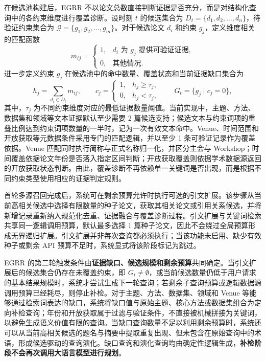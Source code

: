 \documentclass[a4paper,12pt,fontset=none]{ctexart}
\begin{document}
在候选池构建后，EGRR 不以论文总数直接判断证据是否充分，而是对结构化查询中的各约束维度进行覆盖诊断。设时刻 $t$ 的候选集合为 $D_t=\{d_1,d_2,\ldots,d_n\}$，待验证约束集合为 $\mathcal{G}=\{g_1,g_2,\ldots,g_m\}$。对于候选论文 $d_i$ 和约束 $g_j$，定义维度相关的匹配函数
\begin{equation}
	m_{ij}=
	\begin{cases}
		1, & d_i \text{ 为 } g_j \text{ 提供可验证证据},\\
		0, & \text{其他情况}.
	\end{cases}
\end{equation}
进一步定义约束 $g_j$ 在候选池中的命中数量、覆盖状态和当前证据缺口集合为
\begin{equation}
	h_j=\sum_{d_i\in D_t}m_{ij},
	\qquad
	c_j=
	\begin{cases}
		1, & h_j\geq\tau_j,\\
		0, & h_j<\tau_j,
	\end{cases}
	\qquad
	G_t=\{g_j\mid c_j=0\},
\end{equation}
其中，$\tau_j$ 为不同约束维度对应的最低证据数量阈值。当前实现中，主题、方法、数据集和领域等文本证据默认至少需要 2 篇候选支持；候选文本与约束词项的重叠比例达到约束词项数量的一半时，记为一次有效文本命中。Venue、时间范围和开放获取等元数据条件采用专门的匹配逻辑，并以至少 1 条可验证记录作为覆盖依据。Venue 匹配同时执行简称与正式名称归一化，并区分主会与 Workshop；时间覆盖依据论文年份是否落入指定区间判断；开放获取覆盖则依据学术数据源返回的开放获取状态判断。由此，覆盖诊断不再依赖单一关键词是否出现，而是根据不同约束类型使用相应的证据判定规则。

首轮多源召回完成后，系统可在剩余预算允许时执行可选的引文扩展。该步骤从当前高相关候选中选择有限数量的种子论文，获取其相关论文或引用关系候选，并将新增记录重新纳入规范化去重、证据融合与覆盖诊断过程。引文扩展与关键词检索共享同一逻辑调用预算，默认最多选择 1 篇种子论文，因此不会绕过全局预算形成无界递归扩展。引文扩展并非每次查询都必须执行；当该功能未启用、缺少有效种子或剩余 API 预算不足时，系统显式将该阶段标记为跳过。

EGRR 的第二轮触发条件由\textbf{证据缺口、候选规模和剩余预算}共同确定。当引文扩展后的候选集合仍存在未覆盖约束，即 $G_t\neq\emptyset$，或当前候选数量仍低于用户请求的基本结果规模时，系统才尝试生成下一轮查询；若剩余子查询预算或逻辑数据源调用预算已经耗尽，则停止补检。对于主题、方法、数据集、领域和 Venue 等能够通过检索词表达的缺口，系统将缺口值与原始主题、核心方法或数据集组合为定向补检查询；年份和开放获取属于过滤与验证条件，不直接被机械拼接为关键词，以避免生成语义价值有限的查询。当缺口查询数量不足以利用剩余预算时，系统还可以从当前高相关候选的题名与摘要中提取重复出现、但未包含在原始查询中的术语，形成候选驱动的查询演化。缺口查询和演化查询均由确定性逻辑生成，\textbf{补检阶段不会再次调用大语言模型进行规划}。
\end{document}
